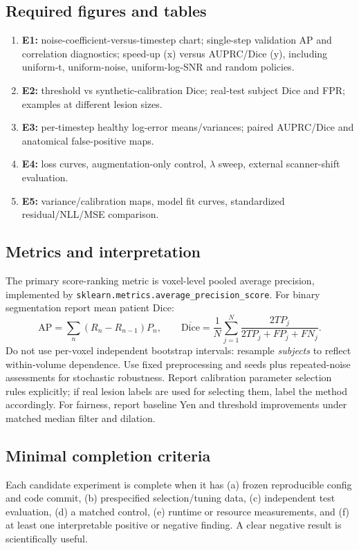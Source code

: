 \documentclass[10pt,a4paper]{article}
\newcommand{\file}[1]{\nolinkurl{#1}}
\begin{document}
\subsection{Required figures and tables}
\begin{enumerate}
\item \textbf{E1:} noise-coefficient-versus-timestep chart; single-step validation AP and correlation diagnostics; speed-up (x) versus AUPRC/Dice (y), including uniform-t, uniform-noise, uniform-log-SNR and random policies.
\item \textbf{E2:} threshold vs synthetic-calibration Dice; real-test subject Dice and FPR; examples at different lesion sizes.
\item \textbf{E3:} per-timestep healthy log-error means/variances; paired AUPRC/Dice and anatomical false-positive maps.
\item \textbf{E4:} loss curves, augmentation-only control, $\lambda$ sweep, external scanner-shift evaluation.
\item \textbf{E5:} variance/calibration maps, model fit curves, standardized residual/NLL/MSE comparison.
\end{enumerate}
\subsection{Metrics and interpretation}
The primary score-ranking metric is voxel-level pooled average precision, implemented by \file{sklearn.metrics.average_precision_score}. For binary segmentation report mean patient Dice:
\begin{equation}
 \mathrm{AP}=\sum_n(R_n-R_{n-1})P_n,\qquad
 \overline{\mathrm{Dice}}=\frac1N\sum_{j=1}^N\frac{2TP_j}{2TP_j+FP_j+FN_j}.
\end{equation}
Do not use per-voxel independent bootstrap intervals: resample \emph{subjects} to reflect within-volume dependence. Use fixed preprocessing and seeds plus repeated-noise assessments for stochastic robustness. Report calibration parameter selection rules explicitly; if real lesion labels are used for selecting them, label the method accordingly. For fairness, report baseline Yen and threshold improvements under matched median filter and dilation.
\subsection{Minimal completion criteria}
Each candidate experiment is complete when it has (a) frozen reproducible config and code commit, (b) prespecified selection/tuning data, (c) independent test evaluation, (d) a matched control, (e) runtime or resource measurements, and (f) at least one interpretable positive or negative finding. A clear negative result is scientifically useful.
\end{document}
